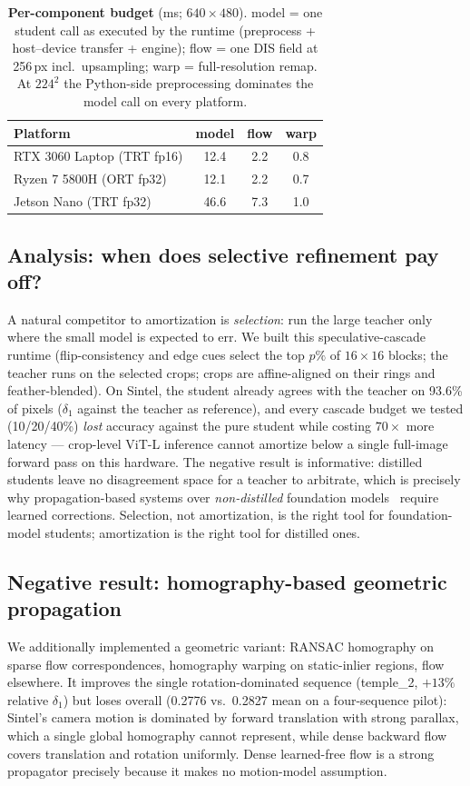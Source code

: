 \documentclass[10pt,twocolumn]{article}
\begin{document}
\begin{table}[t]
\centering\small
\caption{\textbf{Per-component budget} (ms; $640{\times}480$). model = one
student call as executed by the runtime (preprocess + host--device transfer
+ engine); flow = one DIS field at 256\,px incl.\ upsampling; warp =
full-resolution remap. At $224^2$ the Python-side preprocessing dominates
the model call on every platform.}
\label{tab:components}
\begin{tabular}{lccc}
\toprule
Platform & model & flow & warp\\
\midrule
RTX 3060 Laptop (TRT fp16) & 12.4 & 2.2 & 0.8\\
Ryzen 7 5800H (ORT fp32) & 12.1 & 2.2 & 0.7\\
Jetson Nano (TRT fp32) & 46.6 & 7.3 & 1.0\\
\bottomrule
\end{tabular}
\end{table}

\subsection{Analysis: when does selective refinement pay off?}
\label{sec:cascade}
A natural competitor to amortization is \emph{selection}: run the large
teacher only where the small model is expected to err. We built this
speculative-cascade runtime (flip-consistency and edge cues select the top
$p\%$ of $16{\times}16$ blocks; the teacher runs on the selected crops;
crops are affine-aligned on their rings and feather-blended). On Sintel, the
student already agrees with the teacher on 93.6\% of pixels ($\delta_1$
against the teacher as reference), and every cascade budget we tested
(10/20/40\%) \emph{lost} accuracy against the pure student while costing
$70\times$ more latency --- crop-level ViT-L inference cannot amortize below
a single full-image forward pass on this hardware. The negative result is
informative: distilled students leave no disagreement space for a teacher to
arbitrate, which is precisely why propagation-based systems over
\emph{non-distilled} foundation models~\cite{velodepth} require learned
corrections. Selection, not amortization, is the right tool for
foundation-model students; amortization is the right tool for distilled ones.

\subsection{Negative result: homography-based geometric propagation}
We additionally implemented a geometric variant: RANSAC homography on sparse
flow correspondences, homography warping on static-inlier regions, flow
elsewhere. It improves the single rotation-dominated sequence (temple\_2,
$+13\%$ relative $\delta_1$) but loses overall (0.2776 vs.\ 0.2827 mean on a
four-sequence pilot): Sintel's camera motion is dominated by forward
translation with strong parallax, which a single global homography cannot
represent, while dense backward flow covers translation and rotation
uniformly. Dense learned-free flow is a strong propagator precisely because
it makes no motion-model assumption.
\end{document}
